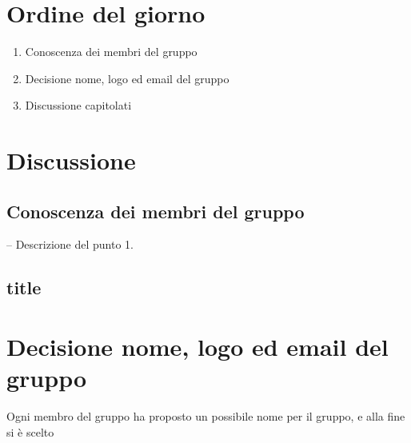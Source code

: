 \documentclass[a4paper,12pt]{article}
\begin{document}
\section*{Ordine del giorno}
\begin{enumerate}
\item Conoscenza dei membri del gruppo
\item Decisione nome, logo ed email del gruppo
\item Discussione capitolati %
\end{enumerate}

\section*{Discussione}
\subsection*{Conoscenza dei membri del gruppo} -- Descrizione del punto 1. \

\subsection*{title}
\section*{Decisione nome, logo ed email del gruppo}
Ogni membro del gruppo ha proposto un possibile nome per il gruppo, e alla fine si è scelto
\end{document}
